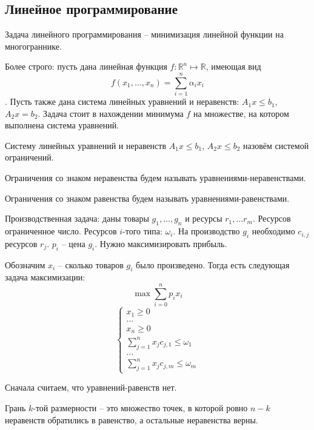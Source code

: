 \documentclass[document.tex]{subfiles}
\begin{document}
\subsection{Линейное программирование}
\begin{definition}
Задача линейного программирования -- минимизация линейной функции на многограннике.

Более строго: пусть дана линейная функция $f: \mathbb{R}^n \mapsto \mathbb{R}$, имеющая вид $$f(x_1, \ldots, x_n) = \sum_{i=1}^n \alpha_i x_i$$. Пусть также дана система линейных уравнений и неравенств: $A_1x \leq b_1$, $A_2x = b_2$. Задача стоит в нахождении минимума $f$ на множестве, на котором выполнена система уравнений.
\end{definition}
\begin{definition}
Систему линейных уравнений и неравенств $A_1x \leq b_1$, $A_2x \leq b_2$ назовём системой ограничений.
\end{definition}
\begin{definition}
Ограничения со знаком неравенства будем называть уравнениями-неравенствами.
\end{definition}
\begin{definition}
Ограничения со знаком равенства будем называть уравнениями-равенствами.
\end{definition}
\begin{example}
Производственная задача: даны товары $g_1, \ldots, g_n$ и ресурсы $r_1, \ldots r_m$. Ресурсов ограниченное число. Ресурсов $i$-того типа: $\omega_i$. На производство $g_i$ необходимо $c_{i, j}$ ресурсов $r_j$. $p_i$ -- цена $g_i$. Нужно максимизировать прибыль.

Обозначим $x_i$ -- сколько товаров $g_i$ было произведено. Тогда есть следующая задача максимизации:
$$\max \sum_{i=0}^n p_i x_i$$
$$\begin{cases}
x_1 \geq 0 \\
\ldots \\
x_n \geq 0 \\
\sum_{j=1}^n x_j c_{j,1} \leq \omega_1 \\
\ldots \\
\sum_{j=1}^n x_j c_{j,m} \leq \omega_m
\end{cases}$$
\end{example}

\begin{remark}
Сначала считаем, что уравнений-равенств нет.
\end{remark}

\begin{definition}
Грань $k$-той размерности -- это множество точек, в которой ровно $n-k$ неравенств обратились в равенство, а остальные неравенства верны.
\end{definition}
\end{document}
